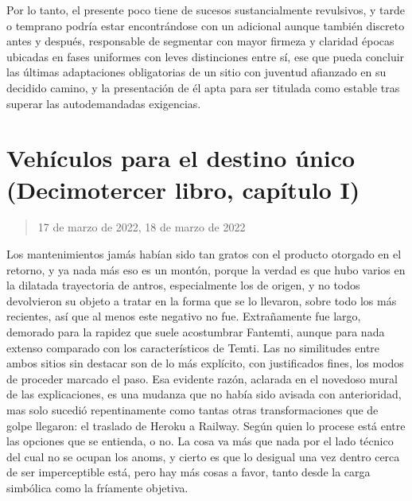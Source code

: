 \documentclass[
]{book}
\begin{document}
Por lo tanto, el presente poco tiene de sucesos sustancialmente revulsivos, y tarde o temprano podría estar encontrándose con un adicional aunque también discreto antes y después, responsable de segmentar con mayor firmeza y claridad épocas ubicadas en fases uniformes con leves distinciones entre sí, ese que pueda concluir las últimas adaptaciones obligatorias de un sitio con juventud afianzado en su decidido camino, y la presentación de él apta para ser titulada como estable tras superar las autodemandadas exigencias.

\hypertarget{vehuxedculos-para-el-destino-uxfanico-decimotercer-libro-capuxedtulo-i}{%
\section{Vehículos para el destino único (Decimotercer libro, capítulo I)}\label{vehuxedculos-para-el-destino-uxfanico-decimotercer-libro-capuxedtulo-i}}

\begin{quote}
17 de marzo de 2022, 18 de marzo de 2022
\end{quote}

Los mantenimientos jamás habían sido tan gratos con el producto otorgado en el retorno, y ya nada más eso es un montón, porque la verdad es que hubo varios en la dilatada trayectoria de antros, especialmente los de origen, y no todos devolvieron su objeto a tratar en la forma que se lo llevaron, sobre todo los más recientes, así que al menos este negativo no fue. Extrañamente fue largo, demorado para la rapidez que suele acostumbrar Fantemti, aunque para nada extenso comparado con los característicos de Temti. Las no similitudes entre ambos sitios sin destacar son de lo más explícito, con justificados fines, los modos de proceder marcado el paso. Esa evidente razón, aclarada en el novedoso mural de las explicaciones, es una mudanza que no había sido avisada con anterioridad, mas solo sucedió repentinamente como tantas otras transformaciones que de golpe llegaron: el traslado de Heroku a Railway. Según quien lo procese está entre las opciones que se entienda, o no. La cosa va más que nada por el lado técnico del cual no se ocupan los anoms, y cierto es que lo desigual una vez dentro cerca de ser imperceptible está, pero hay más cosas a favor, tanto desde la carga simbólica como la fríamente objetiva.
\end{document}
